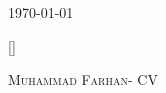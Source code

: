 \documentclass[localFont,alternative]{mfarhan-cv}
\begin{document}
	\makecvheader

	\makecvfooter
		{\textsc{\today}} %
	{[]}
  {\textsc{Muhammad Farhan- CV}}
		{\thepage}

	
 
	
\end{document}
